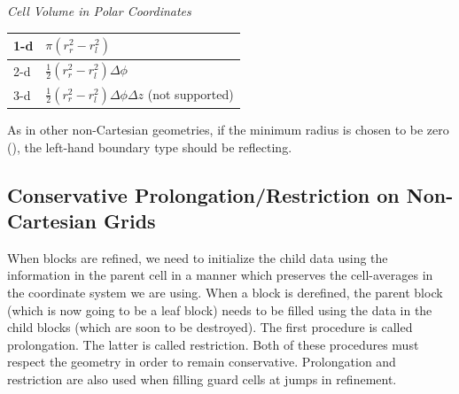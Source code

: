 
\vspace{1cm}
\begin{minipage}{6in}
\renewcommand{\arraystretch}{1.5}
\begin{center}
{\it Cell Volume in Polar Coordinates}%
\begin{tabular}{|l|l|}
\hline
1-d & $ \pi (r_r^2 - r_l^2)$ \\
\hline
2-d & $ \frac{1}{2} (r_r^2 - r_l^2)\Delta \phi$ \\
\hline
3-d & $ \frac{1}{2} (r_r^2 - r_l^2)\Delta \phi \Delta z$ (not supported) \\
\hline
\end{tabular}
\end{center}
\end{minipage}
\vspace{1cm}

As in other non-Cartesian
geometries, if the minimum radius is chosen to be zero
(), the left-hand boundary type should be reflecting.





\subsection{Conservative Prolongation/Restriction on Non-Cartesian Grids}
\label{Sec:Non-Cart Prol/Rest}

When blocks are refined, we need to initialize the child data using the
information in the parent cell in a manner which preserves the
cell-averages in the coordinate system we are using.  When a block is
derefined, the parent block (which is now going to be a leaf block)
needs to be filled using the data in the child blocks (which are soon
to be destroyed).  The first procedure is called prolongation.%
The latter is called restriction.%
Both of these procedures must respect
the geometry in order to remain conservative.  Prolongation and
restriction are also used when filling guard cells at jumps in
refinement.

